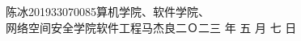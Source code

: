 \documentclass[a4paper]{nuist}
\begin{document}
{陈冰}{201933070085}{算机学院、软件学院、\\网络空间安全学院}{软件工程}{马杰良}{二Ｏ二三\hspace{0.4em} 年\hspace{0.4em} 五\hspace{0.4em} 月\hspace{0.4em} 七\hspace{0.4em} 日}







% 
% 
% 
% 
% 





\end{document}
